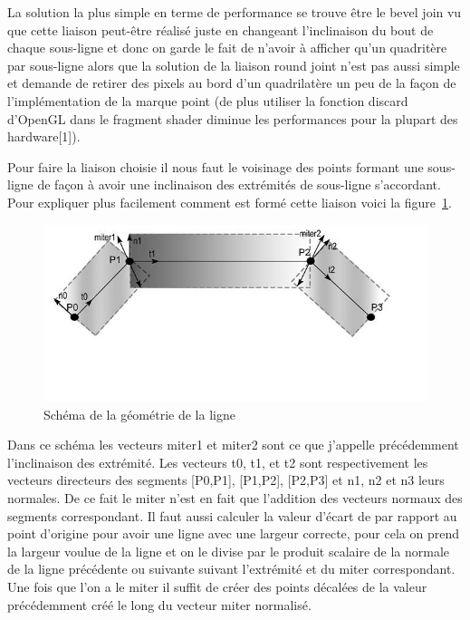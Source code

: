 \documentclass[12pt]{article}
\begin{document}
La solution la plus simple en terme de performance se trouve être le \og bevel join \fg{} vu que cette liaison peut-être réalisé juste en changeant l’inclinaison du bout de chaque sous-ligne et donc on garde le fait de n’avoir à afficher qu’un quadritère par sous-ligne alors que la solution de la liaison  \og round joint \fg{} n’est pas aussi simple et demande de retirer des pixels au bord d’un quadrilatère un peu de la façon de l’implémentation de la marque point (de plus utiliser la fonction discard d’OpenGL dans le fragment shader diminue les performances pour la plupart des hardware[1]).

Pour faire la liaison choisie il nous faut le voisinage des points formant une sous-ligne de façon à avoir une inclinaison des extrémités de sous-ligne s’accordant. Pour expliquer plus facilement comment est formé cette liaison voici la figure~\ref{fig:geom_line}.


\begin{figure}[htp]
  \centering
  \includegraphics[scale=0.8]{images/line_geom}
  \caption{Schéma de la géométrie de la ligne}
  \label{fig:geom_line}
\end{figure}

Dans ce schéma les vecteurs miter1 et miter2 sont ce que j’appelle précédemment l’inclinaison des extrémité. Les vecteurs t0, t1, et t2 sont respectivement les vecteurs directeurs des segments [P0,P1], [P1,P2], [P2,P3] et n1, n2 et n3 leurs normales. De ce fait le miter n’est en fait que l’addition des vecteurs normaux des segments correspondant. Il faut aussi calculer la valeur d’écart de par rapport au point d’origine pour avoir une ligne avec une largeur correcte, pour cela on prend la largeur voulue de la ligne et on le divise par le produit scalaire de la normale de la ligne précédente ou suivante suivant l’extrémité et du miter correspondant. Une fois que l’on a le miter il suffit de créer des points décalées de la valeur précédemment créé le long du vecteur miter normalisé.
\end{document}
